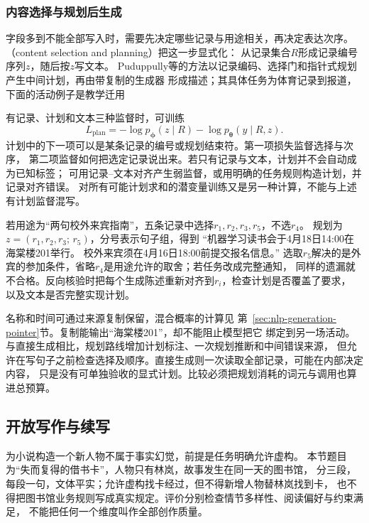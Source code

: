 \subsubsection{内容选择与规划后生成}
\label{sec:nlp-generation-content-planning}

字段多到不能全部写入时，需要先决定哪些记录与用途相关，再决定表达次序。
（content selection and planning）把这一步显式化：
从记录集合$R$形成记录编号序列$z$，随后按$z$写文本。
Puduppully等的方法以记录编码、选择门和指针式规划产生中间计划，再由带复制的生成器
形成描述；其具体任务为体育记录到报道，下面的活动例子是教学迁用

有记录、计划和文本三种监督时，可训练
\begin{equation}
  L_{\mathrm{plan}}
  =-\log p_{\bm{\phi}}(z\mid R)
   -\log p_{\bm{\theta}}(y\mid R,z).
  \label{eq:nlp-generation-plan-loss}
\end{equation}
计划中的下一项可以是某条记录的编号或规划结束符。第一项损失监督选择与次序，
第二项监督如何把选定记录说出来。若只有记录与文本，计划并不会自动成为已知标签；
可用记录--文本对齐产生弱监督，或用明确的任务规则构造计划，并记录对齐错误。
对所有可能计划求和的潜变量训练又是另一种计算，不能与上述有计划监督混写。

若用途为“两句校外来宾指南”，五条记录中选择$r_1,r_2,r_3,r_5$，不选$r_4$。
规划为$z=(r_1,r_2,r_3;\,r_5)$，分号表示句子组，得到
“机器学习读书会于4月18日14:00在海棠楼201举行。
校外来宾须在4月16日18:00前提交报名信息。”
选取$r_5$解决的是外宾的参加条件，省略$r_4$是用途允许的取舍；若任务改成完整通知，
同样的遗漏就不合格。反向核验时把每个生成陈述重新对齐到$r_i$，检查计划是否覆盖了要求，
以及文本是否完整实现计划。

名称和时间可通过来源复制保留，混合概率的计算见
第~\ref{sec:nlp-generation-pointer}节。复制能输出“海棠楼201”，却不能阻止模型把它
绑定到另一场活动。与直接生成相比，规划路线增加计划标注、一次规划推断和中间错误来源，
但允许在写句子之前检查选择及顺序。直接生成则一次读取全部记录，可能在内部决定内容，
只是没有可单独验收的显式计划。比较必须把规划消耗的词元与调用也算进总预算。

\subsection{开放写作与续写}
\label{sec:nlp-generation-open-writing}

为小说构造一个新人物不属于事实幻觉，前提是任务明确允许虚构。
本节题目为“失而复得的借书卡”，人物只有林岚，故事发生在同一天的图书馆，
分三段，每段一句，文体平实；允许虚构找卡经过，但不得新增人物替林岚找到卡，
也不得把图书馆业务规则写成真实规定。评价分别检查情节多样性、阅读偏好与约束满足，
不能把任何一个维度叫作全部创作质量。

